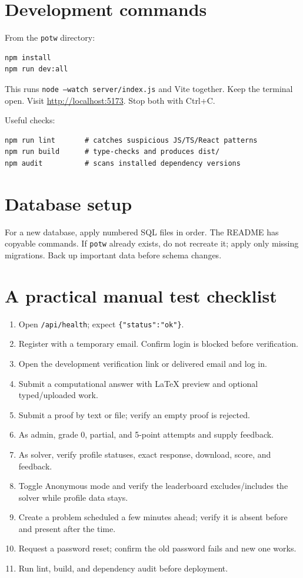 \documentclass[11pt,oneside]{book}
\newcommand{\file}[1]{\texttt{#1}}
\newcommand{\route}[1]{\texttt{#1}}
\newcommand{\code}[1]{\texttt{#1}}
\begin{document}
\section{Development commands}
From the \file{potw} directory:

\begin{lstlisting}[language={},numbers=none]
npm install
npm run dev:all
\end{lstlisting}

This runs \code{node --watch server/index.js} and Vite together. Keep the terminal open. Visit \url{http://localhost:5173}. Stop both with Ctrl+C.

Useful checks:
\begin{lstlisting}[language={},numbers=none]
npm run lint       # catches suspicious JS/TS/React patterns
npm run build      # type-checks and produces dist/
npm audit          # scans installed dependency versions
\end{lstlisting}

\section{Database setup}
For a new database, apply numbered SQL files in order. The README has copyable commands. If \code{potw} already exists, do not recreate it; apply only missing migrations. Back up important data before schema changes.

\section{A practical manual test checklist}
\begin{enumerate}
  \item Open \route{/api/health}; expect \code{\{"status":"ok"\}}.
  \item Register with a temporary email. Confirm login is blocked before verification.
  \item Open the development verification link or delivered email and log in.
  \item Submit a computational answer with LaTeX preview and optional typed/uploaded work.
  \item Submit a proof by text or file; verify an empty proof is rejected.
  \item As admin, grade 0, partial, and 5-point attempts and supply feedback.
  \item As solver, verify profile statuses, exact response, download, score, and feedback.
  \item Toggle Anonymous mode and verify the leaderboard excludes/includes the solver while profile data stays.
  \item Create a problem scheduled a few minutes ahead; verify it is absent before and present after the time.
  \item Request a password reset; confirm the old password fails and new one works.
  \item Run lint, build, and dependency audit before deployment.
\end{enumerate}
\end{document}
